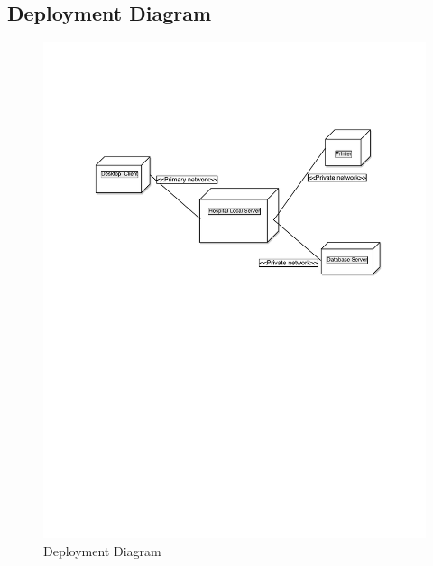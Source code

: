 \documentclass[14pt]{article}
\begin{document}
	\subsection{Deployment Diagram}
		\begin{figure}[h!]
			\centering 
			\caption{Deployment Diagram}
			\includegraphics[width=15cm,keepaspectratio]{DeploymentDiagram.pdf}
		\end{figure}
\newpage 
\end{document}

